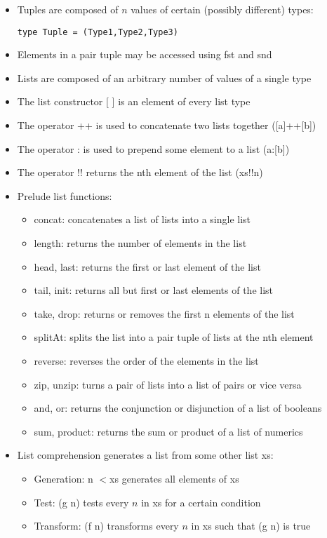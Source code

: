 \documentclass{article}
\begin{document}
\begin{itemize}
\item Tuples are composed of $n$ values of certain (possibly different) types:
\begin{lstlisting}
type Tuple = (Type1,Type2,Type3)
\end{lstlisting}
\item Elements in a pair tuple may be accessed using fst and snd
\item Lists are composed of an arbitrary number of values of a single type
\item The list constructor [ ] is an element of every list type
\item The operator ++ is used to concatenate two lists together ([a]++[b])
\item The operator : is used to prepend some element to a list (a:[b])
\item The operator !! returns the nth element of the list (xs!!n)
\item Prelude list functions:
\begin{itemize}
\item concat: concatenates a list of lists into a single list
\item length: returns the number of elements in the list
\item head, last: returns the first or last element of the list
\item tail, init: returns all but first or last elements of the list
\item take, drop: returns or removes the first n elements of the list
\item splitAt: splits the list into a pair tuple of lists at the nth element
\item reverse: reverses the order of the elements in the list
\item zip, unzip: turns a pair of lists into a list of pairs or vice versa
\item and, or: returns the conjunction or disjunction of a list of booleans
\item sum, product: returns the sum or product of a list of numerics
\end{itemize}
\item List comprehension generates a list from some other list xs:
\begin{itemize}
\begin{lstlisting}
[(f n) | n<-xs, (g n)]
\end{lstlisting}
\item Generation: n $<$\textemdash xs generates all elements of xs
\item Test: (g n) tests every $n$ in xs for a certain condition
\item Transform: (f n) transforms every $n$ in xs such that (g n) is true
\end{itemize}
\end{itemize}
\end{document}
